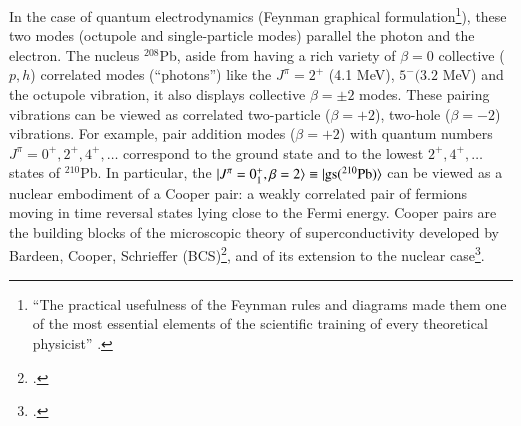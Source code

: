 In the case of quantum electrodynamics (Feynman graphical formulation\footnote{``The practical usefulness of the Feynman rules and diagrams made them one of the most essential elements of the scientific training of every theoretical physicist'' \citep{Mehra:96}.}),  these two modes (octupole and single-particle modes) parallel the photon and the electron. The nucleus $^{208}$Pb, aside from having a rich variety of $\beta=0$ collective ($p,h$) correlated modes (``photons'') like the $J^\pi=2^+$ (4.1 MeV), $5^-(3.2$ MeV) and the octupole vibration, it also displays collective $\beta=\pm2$ modes. These pairing vibrations can be viewed as correlated two-particle ($\beta=+2$), two-hole ($\beta=-2$) vibrations. For example, pair addition modes ($\beta=+2$) with quantum numbers $J^\pi=0^+,2^+,4^+,\dots$ correspond to the ground state and to the lowest $2^+,4^+,\dots$ states of $^{210}$Pb. In particular,  the $|{J^\pi=0^+_1,\beta=2} \rangle\equiv |{\text{gs}(^{210}\text{Pb})} \rangle$ can be viewed as a nuclear embodiment of a Cooper pair: a weakly correlated pair of fermions moving in time reversal states lying close to the Fermi energy. Cooper pairs are the building blocks of the microscopic theory of superconductivity developed by Bardeen, Cooper, Schrieffer (BCS)\footnote{\cite{Bardeen:57a,Bardeen:57b}.}, and of its extension to the nuclear case\footnote{\cite{Bohr:58}.}.


